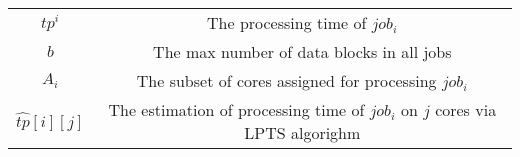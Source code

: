 \documentclass{llncs}
\begin{document}
\begin{appendices}
\begin{table}[htbp]
\begin{center}
\begin{tabular}{c|c}
$tp^i$  & The processing time of $job_i$ \\
$b$  & The max number of data blocks in all jobs \\
$A_i$  & The subset of cores assigned for processing $job_i$ \\
$\hat{tp}[i][j]$  & The estimation of processing time of $job_i$ on $j$ cores via LPTS algorighm \\

\bottomrule
\end{tabular}
\label{tabSYMBOLS}
\end{center}
\end{table}

\end{appendices}

\begin{comment}
\begin{thebibliography}{8}
\bibitem{ref_article}
Author, F.: Article title. Journal \textbf{2}(5), 99--110 (2016)
 \bibitem{dean2008mapreduce}
 Dean J, Ghemawat S. MapReduce: simplified data processing on large clusters[J]. Communications of the ACM, 2008, 51(1): 107-113.

 \bibitem{ref_lncs1}
 Author, F., Author, S.: Title of a proceedings paper. In: Editor,
 F., Editor, S. (eds.) CONFERENCE 2016, LNCS, vol. 9999, pp. 1--13.
 Springer, Heidelberg (2016).

 \bibitem{ref_book1}
 Author, F., Author, S., Author, T.: Book title. 2nd edn. Publisher,
 Location (1999)

 \bibitem{ref_proc1}
 Author, A.-B.: Contribution title. In: 9th International Proceedings
 on Proceedings, pp. 1--2. Publisher, Location (2010)

 \bibitem{ref_url1}
 LNCS Homepage, \url{http://www.springer.com/lncs}. Last accessed 4
 Oct 2017
\end{thebibliography}
\end{comment}
\end{document}
